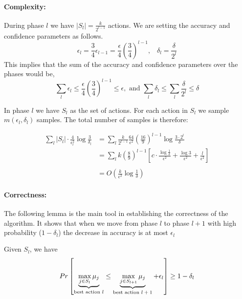 \paragraph{Complexity:}

During phase $l$ we have $\left|S_{l}\right|=\frac{k}{2^{l-1}}$
actions. We are setting the accuracy and confidence parameters as follows.
\[
\epsilon_{l}=\frac{3}{4}\epsilon_{l-1}=\frac{\epsilon}{4}\left(\frac{3}{4}\right)^{l-1},\;\;\;\delta_{l}=\frac{\delta}{2^{l}}
\]
This implies that the sum of the accuracy and confidence parameters over the phases would be,
\[
 \sum_l\epsilon_{l}\le\frac{\epsilon}{4}\left(\frac{3}{4}\right)^{l-1}\le \epsilon, \text{ and } \sum_l\delta_{l}\le\sum_l \frac{\delta}{2^{l}} \le\delta
\]

In phase $l$ we have $S_l$ as the set of actions. For each action in $S_l$ we sample $m(\epsilon_l,\delta_l)$ samples.
The total number of samples is therefore:

\begin{align*}
 \sum_l |S_l| \cdot \frac{4}{\epsilon_l^2}\log \frac{3}{\delta_l} &=
\sum_{l}\frac{k}{2^{l-1}}\frac{64}{\epsilon^{2}}\left(\frac{16}{9}\right)^{l-1}\log\frac{3\cdot2^{l}}{\delta}\\
& =  {\displaystyle \sum_{l}k\left(\frac{8}{9}\right)^{l-1}\left[c\cdot\frac{\log\frac{1}{\delta}}{\epsilon^{2}}+\frac{\log3}{\epsilon^{2}}+\frac{l}{\epsilon^{2}}\right]}\\
\\
 & =  O\left(\frac{k}{\epsilon^{2}}\log\frac{1}{\delta}\right)
\end{align*}


\paragraph{Correctness:}
The following lemma is the main tool in establishing the correctness of the algorithm. It shows that when we move from phase $l$ to phase $l+1$ with high probability ($1-\delta_l$) the decrease in accuracy is at most $\epsilon_l$

\begin{lemma}
Given $S_l$, we have
$$Pr\left[\underbrace{{\displaystyle \max_{j\in
S_{l}}\mu_{j}}}_{\text{best action
\ensuremath{l}}}\le\underbrace{{\displaystyle \max_{j\in
S_{l+1}}\mu_{j}}}_{\text{best action
\ensuremath{l+1}}}+\epsilon_{l}\right]\ge1-\delta_{l}$$
\end{lemma}

